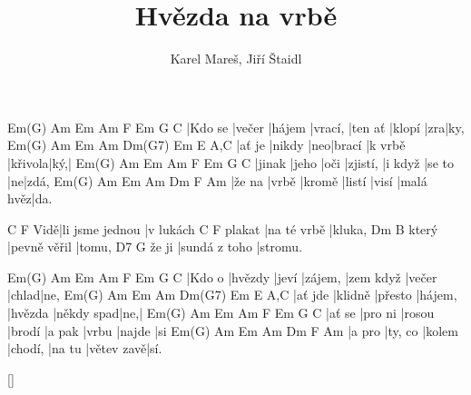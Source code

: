 \documentclass{song}
\title{Hvězda na vrbě}
\author{Karel Mareš, Jiří Štaidl}
\begin{document}
\strophe
Em(G)   Am     Em     Am      F       Em     G   C
|Kdo se |večer |hájem |vrací, |ten ať |klopí |zra|ky,
Em(G)  Am     Em  Am     Dm(G7) Em         E   A,C
|ať je |nikdy |neo|brací |k vrbě |křivola|ký,|
Em(G)  Am    Em   Am       F       Em     G  C
|jinak |jeho |oči |zjistí, |i když |se to |ne|zdá,
Em(G)  Am    Em     Am     Dm    F         Am
|že na |vrbě |kromě |listí |visí |malá hvěz|da.
\endstrophe

    C               F
Vidě|li jsme jednou |v lukách
       C           F
plakat |na té vrbě |kluka,
      Dm           B
který |pevně věřil |tomu,
      D7           G
že ji |sundá z toho |stromu.
\endstrophe

\strophe
Em(G)  Am      Em    Am      F         Em     G     C
|Kdo o |hvězdy |jeví |zájem, |zem když |večer |chlad|ne,
Em(G)   Am      Em      Am      Dm(G7) Em         E   A,C
|ať jde |klidně |přesto |hájem, |hvězda |někdy spad|ne,|
Em(G)  Am      Em     Am     F      Em    G      C
|ať se |pro ni |rosou |brodí |a pak |vrbu |najde |si
Em(G)  Am      Em     Am      Dm     F          Am
|a pro |ty, co |kolem |chodí, |na tu |větev zavě|sí.
\endstrophe

\ref{}
\end{document}
